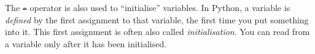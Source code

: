 The \verb!=! operator is also used to ``initialise'' variables.
In Python, a variable is \emph{defined} by the first assignment to
that variable, the first time you put something into it. This first
assignment is often also called \emph{initialisation}.
You can read from a variable only after it has been initialised.







